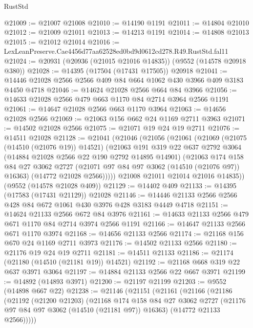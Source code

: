 \begin{lexlean}{RustStd}
\begin{coremodule}
@21009 := @21007 @21008
@21010 := @14190 @1191
@21011 := @14804 @21010
@21012 := @21009 @21011
@21013 := @14213 @1191
@21014 := @14808 @21013
@21015 := @21012 @21014
@21016 := LexLeanPreserve.Cae4456d77aa62528ed0bd9d0612cd278.R49.RustStd.fal11
@21024 := @20931 (@20936 (@21015 @21016 @14835)) (@9552 (@14578 @20918 @380))
@21028 := @14395 (@17504 (@17431 @17505)) @20918
@21041 := @14446 @21028 @2566 @2566 @409 @84 @664 @1062 @430 @3966 @409 @3183 @4450 @4718
@21046 := @14624 @21028 @2566 @664 @84 @3966
@21056 := @14633 @21028 @2566 @479 @663 @1170 @84 @2714 @3964 @2566 @1191
@21061 := @14647 @21028 @2566 @663 @1170 @3964
@21063 := @14656 @21028 @2566
@21069 := @21063 @156 @662 @24 @1169 @2711 @3963
@21071 := @14502 @21028 @2566
@21075 := @21071 @19 @24 @19 @2711
@21076 := @14511 @21028
@21128 := @21041
    (@21046
      (@21056
        (@21061
          (@21069
            (@21075 (@14510 (@21076 @19)) @14521)
            (@21063
              @191
              @319
              @22
              @637
              @2792
              @3064
              (@14884 @21028 @2566 @22 @190 @2792 @14895 @14901)
              (@21063
                @174
                @158
                @84
                @27
                @3062
                @2727
                (@21071 @97 @84 @97 @3062 (@14510 (@21076 @97)) @16363)
                (@14772 @21028 @2566)))))
        @21008
        @21011
        @21014
        @21016
        @14835))
    (@9552 (@14578 @21028 @409))
@21129 := @14402 @409
@21133 := @14395 (@17583 (@17431 @21129)) @21028
@21146 := @14446 @21133 @2566 @2566 @428 @84 @672 @1061 @430 @3976 @428 @3183 @4449 @4718
@21151 := @14624 @21133 @2566 @672 @84 @3976
@21161 := @14633 @21133 @2566 @479 @671 @1170 @84 @2714 @3974 @2566 @1191
@21166 := @14647 @21133 @2566 @671 @1170 @3974
@21168 := @14656 @21133 @2566
@21174 := @21168 @156 @670 @24 @1169 @2711 @3973
@21176 := @14502 @21133 @2566
@21180 := @21176 @19 @24 @19 @2711
@21181 := @14511 @21133
@21186 := @21174 (@21180 (@14510 (@21181 @19)) @14521)
@21192 := @21168 @668 @319 @22 @637 @3971 @3064
@21197 := @14884 @21133 @2566 @22 @667 @3971
@21199 := @14892 (@14893 @3971)
@21200 := @21197 @21199
@21203 := @9552 (@14898 @667 @22)
@21238 := @21146
    (@21151
      (@21161
        (@21166
          (@21186
            (@21192
              (@21200 @21203)
              (@21168
                @174
                @158
                @84
                @27
                @3062
                @2727
                (@21176 @97 @84 @97 @3062 (@14510 (@21181 @97)) @16363)
                (@14772 @21133 @2566)))))

\end{coremodule}
\end{lexlean}
